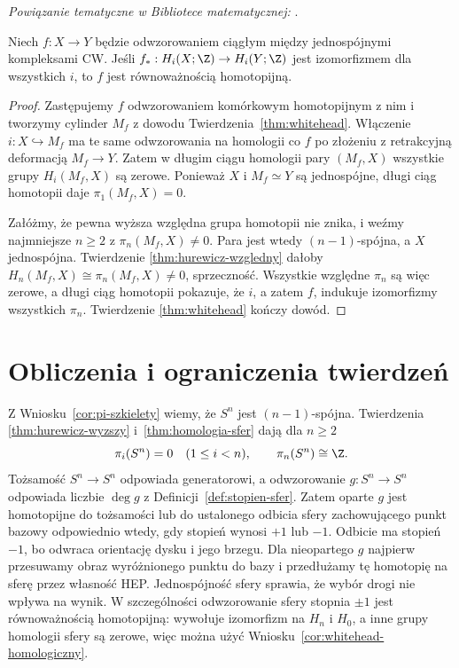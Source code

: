 \noindent\emph{Powiązanie tematyczne w Bibliotece matematycznej:} .

\begin{wniosek}
\label{cor:whitehead-homologiczny}
Niech $f:X\to Y$ będzie odwzorowaniem ciągłym
między jednospójnymi
kompleksami CW.
Jeśli
$f_*:H_i(X;\Z)\to H_i(Y;\Z)$
jest izomorfizmem
dla wszystkich $i$,
to $f$ jest
równoważnością
homotopijną.
\end{wniosek}
\begin{proof}
Zastępujemy $f$
odwzorowaniem komórkowym
homotopijnym z nim
i tworzymy cylinder
$M_f$ z dowodu
Twierdzenia~\ref{thm:whitehead}.
Włączenie
$i:X\hookrightarrow M_f$
ma te same odwzorowania
na homologii co $f$
po złożeniu z
retrakcyjną deformacją
$M_f\to Y$.
Zatem w długim
ciągu homologii
pary $(M_f,X)$
wszystkie grupy
$H_i(M_f,X)$
są zerowe.
Ponieważ $X$
i $M_f\simeq Y$
są jednospójne,
długi ciąg homotopii
daje
$\pi_1(M_f,X)=0$.

Załóżmy, że pewna
wyższa względna
grupa homotopii
nie znika, i weźmy
najmniejsze $n\geq2$
z $\pi_n(M_f,X)\ne0$.
Para jest wtedy
$(n-1)$-spójna,
a $X$ jednospójna.
Twierdzenie
\ref{thm:hurewicz-wzgledny}
dałoby
$H_n(M_f,X)\cong
\pi_n(M_f,X)\ne0$,
sprzeczność.
Wszystkie względne
$\pi_n$ są więc
zerowe, a długi
ciąg homotopii
pokazuje, że
$i$, a zatem $f$,
indukuje izomorfizmy
wszystkich $\pi_n$.
Twierdzenie
\ref{thm:whitehead}
kończy dowód.
\end{proof}

\section{Obliczenia i ograniczenia twierdzeń}
\label{sec:pi-przyklady}

\begin{przyklad}
\label{prz:pi-sfera-hurewicz}
Z Wniosku~\ref{cor:pi-szkielety}
wiemy, że $S^n$
jest $(n-1)$-spójna.
Twierdzenia
\ref{thm:hurewicz-wyzszy}
i~\ref{thm:homologia-sfer}
dają dla $n\geq2$
\[
 \pi_i(S^n)=0\quad(1\leq i<n),
 \qquad
 \pi_n(S^n)\cong\Z.
\]
Tożsamość $S^n\to S^n$
odpowiada generatorowi,
a odwzorowanie $g:S^n\to S^n$
odpowiada liczbie
$\deg g$ z
Definicji~\ref{def:stopien-sfer}.
Zatem oparte $g$ jest homotopijne do tożsamości lub do ustalonego
odbicia sfery zachowującego punkt bazowy odpowiednio wtedy,
gdy stopień wynosi $+1$ lub $-1$.
Odbicie ma stopień $-1$, bo odwraca orientację dysku i jego brzegu.
Dla nieopartego $g$ najpierw przesuwamy obraz wyróżnionego punktu do bazy
i przedłużamy tę homotopię na sferę przez własność HEP.
Jednospójność sfery sprawia, że wybór drogi nie wpływa na wynik. W szczególności
odwzorowanie sfery stopnia
$\pm1$ jest
równoważnością
homotopijną:
wywołuje izomorfizm
na $H_n$ i $H_0$,
a inne grupy homologii
sfery są zerowe,
więc można użyć
Wniosku~\ref{cor:whitehead-homologiczny}.
\end{przyklad}

